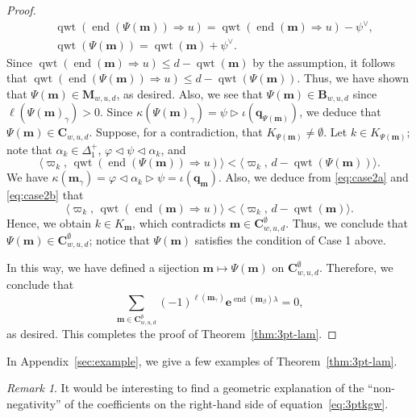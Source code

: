 \documentclass[11pt,a4paper,reqno,dvipdfmx]{amsart}
\numberwithin{equation}{section}
\newcommand{\vp}{\varphi}
\newcommand{\vpi}{\varpi}
\newcommand{\be}{\mathbf{e}}
\newcommand{\bm}{\mathbf{m}}
\newcommand{\bq}{\mathbf{q}}
\newcommand{\bB}{\mathbf{B}}
\newcommand{\bC}{\mathbf{C}}
\newcommand{\bM}{\mathbf{M}}
\DeclareMathOperator{\qwt}{qwt}
\DeclareMathOperator{\ed}{end}
\newcommand{\pair}[2]{\langle #1,\,#2 \rangle}
\theoremstyle{plain}
\theoremstyle{definition}
\theoremstyle{remark}
\newtheorem{rem}[lem]{Remark}
\begin{document}
\begin{proof}
\begin{equation}
%
\begin{split}
& \qwt(\ed(\Psi(\bm)) \Rightarrow u) = 
  \qwt(\ed(\bm) \Rightarrow u) - \psi^{\vee}, \\
& \qwt(\Psi(\bm)) = \qwt(\bm) + \psi^{\vee}.
\end{split}
%
\end{equation}
%
Since $\qwt(\ed(\bm) \Rightarrow u) \le d - \qwt(\bm)$ by the assumption, 
it follows that $\qwt(\ed(\Psi(\bm)) \Rightarrow u) \le d - \qwt(\Psi(\bm))$. 
Thus, we have shown that $\Psi(\bm) \in \bM_{w,u,d}$, as desired. 
%
Also, we see that $\Psi(\bm) \in \bB_{w,u,d}$ 
since $\ell( \Psi(\bm)_{\gamma} ) > 0$. 
Since $\kappa( \Psi(\bm)_{\gamma} ) = \psi \rhd \iota(\bq_{\Psi(\bm)})$, 
we deduce that $\Psi(\bm) \in \bC_{w,u,d}$. 
%
Suppose, for a contradiction, that $K_{\Psi(\bm)} \ne \emptyset$. 
Let $k \in K_{\Psi(\bm)}$; note that $\alpha_{k} \in \Delta_{1}^{+}$, 
$\vp \lhd \psi \lhd \alpha_{k}$, and 
%
\begin{equation*}
\pair{\vpi_{k}}{\qwt(\ed(\Psi(\bm)) \Rightarrow u)} < \pair{\vpi_{k}}{d- \qwt(\Psi(\bm))}.
\end{equation*}
%
We have $\kappa(\bm_{\gamma}) = \vp \lhd \alpha_{k} \rhd \psi = \iota(\bq_{\bm})$. 
Also, we deduce from \eqref{eq:case2a} and \eqref{eq:case2b} that 
%
\begin{equation*}
\pair{\vpi_{k}}{\qwt(\ed(\bm) \Rightarrow u)} < \pair{\vpi_{k}}{d- \qwt(\bm)}.
\end{equation*}
%
Hence, we obtain $k \in K_{\bm}$, which contradicts $\bm \in \bC_{w,u,d}^{\emptyset}$. 
Thus, we conclude that $\Psi(\bm) \in \bC_{w,u,d}^{\emptyset}$; notice that 
$\Psi(\bm)$ satisfies the condition of Case 1 above. 

\medskip

In this way, we have defined a sijection $\bm \mapsto \Psi(\bm)$ on $\bC_{w,u,d}^{\emptyset}$. 
Therefore, we conclude that 
%
\begin{equation*}
\sum_{ \bm \in \bC_{w,u,d}^{\emptyset}  }
(-1)^{\ell(\bm_{\gamma})} \be^{\ed(\bm_{\beta})\lambda} = 0, 
\end{equation*}
%
as desired. This completes the proof of Theorem~\ref{thm:3pt-lam}. 
\end{proof}

In Appendix~\ref{sec:example}, we give a few examples of Theorem~\ref{thm:3pt-lam}. 

\begin{rem}
It would be interesting to find a geometric explanation of the ``non-negativity'' of 
the coefficients on the right-hand side of equation~\eqref{eq:3ptkgw}. 
\end{rem}
\end{document}
